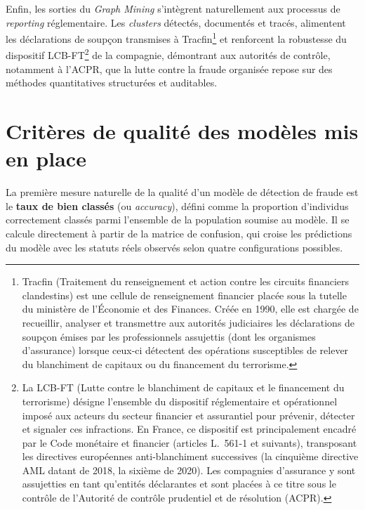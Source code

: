 Enfin, les sorties du \textit{Graph Mining} s'intègrent naturellement aux processus de \textit{reporting} réglementaire. Les \textit{clusters} détectés, documentés et tracés, alimentent les déclarations de soupçon transmises à Tracfin\footnote{Tracfin (Traitement du renseignement et action contre les circuits financiers clandestins) est une cellule de renseignement financier placée sous la tutelle du ministère de l'Économie et des Finances. Créée en 1990, elle est chargée de recueillir, analyser et transmettre aux autorités judiciaires les déclarations de soupçon émises par les professionnels assujettis (dont les organismes d'assurance) lorsque ceux-ci détectent des opérations susceptibles de relever du blanchiment de capitaux ou du financement du terrorisme.} et renforcent la robustesse du dispositif LCB-FT\footnote{La LCB-FT (Lutte contre le blanchiment de capitaux et le financement du terrorisme) désigne l'ensemble du dispositif réglementaire et opérationnel imposé aux acteurs du secteur financier et assurantiel pour prévenir, détecter et signaler ces infractions. En France, ce dispositif est principalement encadré par le Code monétaire et financier (articles L.~561-1 et suivants), transposant les directives européennes anti-blanchiment successives (la cinquième directive AML datant de 2018, la sixième de 2020). Les compagnies d'assurance y sont assujetties en tant qu'entités déclarantes et sont placées à ce titre sous le contrôle de l'Autorité de contrôle prudentiel et de résolution (ACPR).} de la compagnie, démontrant aux autorités de contrôle, notamment à l'ACPR, que la lutte contre la fraude organisée repose sur des méthodes quantitatives structurées et auditables.

\section{Critères de qualité des modèles mis en place}
\label{sec:criteres-evaluation}


La première mesure naturelle de la qualité d'un modèle de détection de fraude est le \textbf{taux de bien classés} (ou \textit{accuracy}), défini comme la proportion d'individus correctement classés parmi l'ensemble de la population soumise au modèle. Il se calcule directement à partir de la matrice de confusion, qui croise les prédictions du modèle avec les statuts réels observés selon quatre configurations possibles.

